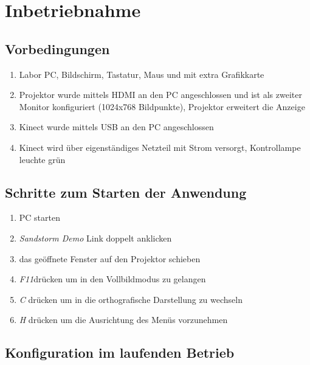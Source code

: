\chapter{Inbetriebnahme}
\begin{Spacing}{\mylinespace}

\section{Vorbedingungen}

\begin{enumerate}
	\item Labor PC, Bildschirm, Tastatur, Maus und mit extra Grafikkarte
	\item Projektor wurde mittels HDMI an den PC angeschlossen und ist als zweiter Monitor konfiguriert (1024x768 Bildpunkte), Projektor erweitert die Anzeige
	\item Kinect wurde mittels USB an den PC angeschlossen
	\item Kinect wird über eigenständiges Netzteil mit Strom versorgt, Kontrollampe leuchte grün
\end{enumerate}

\section{Schritte zum Starten der Anwendung}

\begin{enumerate}
	\item PC starten
	\item \textit{Sandstorm Demo} Link doppelt anklicken
	\item das geöffnete Fenster auf den Projektor schieben
	\item \textit{F11}drücken um in den Vollbildmodus zu gelangen
	\item \textit{C} drücken um in die orthografische Darstellung zu wechseln
	\item \textit{H} drücken um die Ausrichtung des Menüs vorzunehmen
	
\end{enumerate}

\section{Konfiguration im laufenden Betrieb}

\renewcommand{\arraystretch}{1.21}


\end{Spacing}
